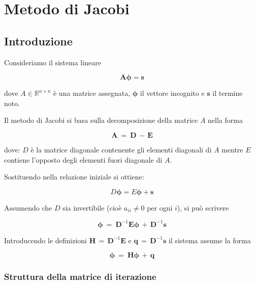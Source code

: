 \chapter{Metodo di Jacobi}

\section{Introduzione}

Consideriamo il sistema lineare

\begin{equation}
	\mathbf A \boldsymbol{\phi} = \boldsymbol{s}
\end{equation}

dove $A \in \mathbb{R}^{n \times n}$ è una matrice assegnata, $\boldsymbol{\phi}$ il vettore incognito e $\boldsymbol{s}$ il termine noto.

Il metodo di Jacobi si basa sulla decomposizione della matrice $A$ nella forma

\begin{equation*}
	\mathbf A\ =\ \mathbf D \,-\, \mathbf E
\end{equation*}

dove: $D$ è la matrice diagonale contenente gli elementi diagonali di $A$ mentre $E$ contiene l'opposto degli elementi fuori diagonale di $A$.

Sostituendo nella relazione iniziale si ottiene:

\begin{equation*}
	D \boldsymbol{\phi} = E \boldsymbol{\phi} + \boldsymbol{s}
\end{equation*}

Assumendo che $D$ sia invertibile (cioè $a_{ii} \neq 0$ per ogni $i$), si può scrivere

\begin{equation*}
	\boldsymbol{\phi}\ =\ \mathbf D^{-1} \mathbf E \boldsymbol{\phi} \,+\, \mathbf D^{-1} \boldsymbol{s}
\end{equation*}

Introducendo le definizioni $\mathbf H \, =\, \mathbf D^{-1} \mathbf E$ e $\boldsymbol{q}\, =\, \mathbf D^{-1} \boldsymbol{s}$ il sistema assume la forma

\begin{equation*}
	\boldsymbol{\phi}\ =\ \mathbf H \boldsymbol{\phi}\, +\, \boldsymbol{q}
\end{equation*}

%
\subsection{Struttura della matrice di iterazione}

